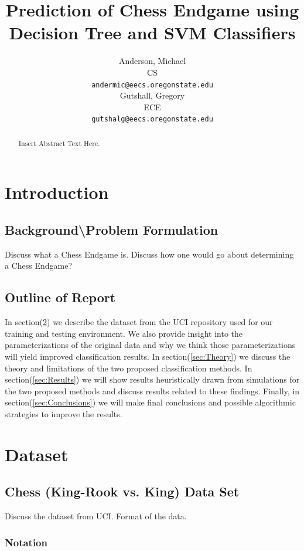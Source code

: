 \documentclass[fleqn]{article}
\title{Prediction of Chess Endgame using\\
Decision Tree and SVM Classifiers}
\author{
Anderson, Michael\\
CS\\ 
\texttt{andermic@eecs.oregonstate.edu} \\
\AND
Gutshall, Gregory\\
ECE\\
\texttt{gutshalg@eecs.oregonstate.edu} \\
}
\begin{document}
\maketitle

\begin{abstract}
Insert Abstract Text Here.
\end{abstract}

\section{Introduction}
\label{sec:Intro}
%
\subsection[Background]{Background\textbackslash Problem Formulation}
\label{subsec:Background}
Discuss what a Chess Endgame is.  Discuss how one would go about determining a Chess Endgame?  
%
\subsection{Outline of Report}
\label{subsec:outline}
In section(\ref{sec:Dataset}) we describe the dataset from the UCI repository used for our training and testing environment.  We also provide insight into the parameterizations of the original data and why we think those parameterizations will yield improved classification results.  In section(\ref{sec:Theory}) we discuss the theory and limitations of the two proposed classification methods.  In section(\ref{sec:Results}) we will show results heuristically drawn from simulations for the two proposed methods and discuss results related to these findings.  Finally, in section(\ref{sec:Conclusions}) we will make final conclusions and possible algorithmic strategies to improve the results. 

\section{Dataset}
\label{sec:Dataset}

\subsection{Chess (King-Rook vs. King) Data Set}
\label{subsec:dataset}
Discuss the dataset from UCI\cite{MichaelBain:1994}.  Format of the data.

\subsubsection{Notation}
\end{document}

